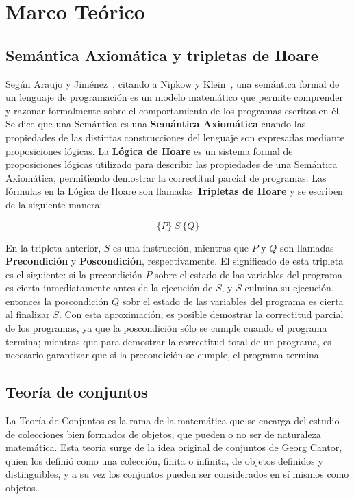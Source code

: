 \chapter{Marco Teórico}
\label{capitulo1}

\section{Semántica Axiomática y tripletas de Hoare}

Según Araujo y Jiménez~\cite{ayj}, citando a Nipkow y Klein~\cite{concrete}, una
semántica formal de un lenguaje de programación es un modelo matemático que
permite comprender y razonar formalmente sobre el comportamiento de los
programas escritos en él. Se dice que una Semántica es una \textbf{Semántica
Axiomática} cuando las propiedades de las  distintas construcciones del lenguaje
son expresadas mediante proposiciones lógicas. La \textbf{Lógica de Hoare} es un
sistema formal de proposiciones lógicas utilizado para describir  las
propiedades de una Semántica Axiomática, permitiendo demostrar la correctitud
parcial de programas. Las fórmulas en la Lógica de Hoare son llamadas
\textbf{Tripletas de Hoare} y se escriben de la siguiente manera:

$$ \{P\}\ S\ \{Q\} $$

En la tripleta anterior, $S$ es una instrucción, mientras que $P$ y $Q$ son
llamadas \textbf{Precondición} y \textbf{Poscondición}, respectivamente. El
significado de esta tripleta es el siguiente: si la precondición $P$ sobre el
estado de las variables del programa es cierta inmediatamente antes de la
ejecución de $S$, y $S$ culmina su ejecución, entonces la poscondición $Q$ sobr
el estado de las variables del programa es cierta al finalizar $S$. Con esta
aproximación, es posible demostrar la correctitud parcial de los programas, ya
que la poscondición sólo se cumple cuando el programa termina; mientras que para
demostrar la correctitud total de un programa, es necesario garantizar que si la
precondición se cumple, el programa termina.

\section{Teoría de conjuntos}

La Teoría de Conjuntos es la rama de la matemática que se encarga del estudio de
colecciones bien formados de objetos, que pueden o no ser de naturaleza
matemática. Esta teoría surge de la idea original de conjuntos de Georg Cantor,
quien los definió como una colección, finita o infinita, de objetos definidos y
distinguibles, y a su vez los conjuntos pueden ser considerados en sí mismos
como objetos.

